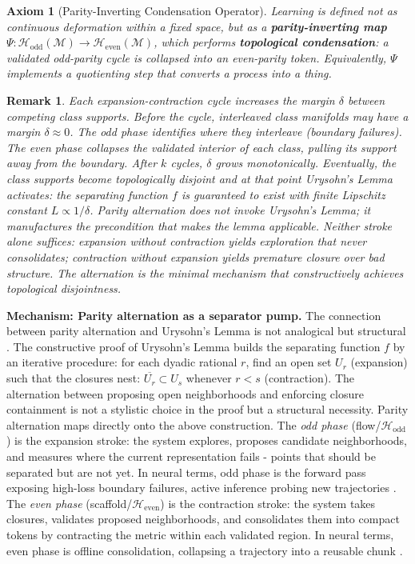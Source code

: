 \documentclass{article}
\newcommand{\Heven}{\mathcal{H}_{\text{even}}}
\newcommand{\Hodd}{\mathcal{H}_{\text{odd}}}
\newtheorem{remark}{Remark}
\newtheorem{axiom}{Axiom}
\begin{document}
\begin{axiom}[Parity-Inverting Condensation Operator]
Learning is defined not as continuous deformation within a fixed space, but as a \textbf{parity-inverting map}
$\Psi:\Hodd(\mathcal{M}) \rightarrow \Heven(\mathcal{M})$,
which performs \textbf{topological condensation}: a validated odd-parity cycle is collapsed into an even-parity token. Equivalently, $\Psi$ implements a quotienting step that converts a \emph{process} into a \emph{thing}.
\end{axiom}

\begin{remark}
Each expansion-contraction cycle increases the margin $\delta$ between competing class supports. Before the cycle, interleaved class manifolds may have a margin $\delta \approx 0$. The odd phase identifies \emph{where} they interleave (boundary failures). The even phase collapses the validated interior of each class, pulling its support away from the boundary. After $k$ cycles, $\delta$ grows monotonically. Eventually, the class supports become topologically disjoint and at that point Urysohn's Lemma activates: the separating function $f$ is guaranteed to exist with finite Lipschitz constant $L \propto 1/\delta$. Parity alternation does not invoke Urysohn's Lemma; it \emph{manufactures the precondition} that makes the lemma applicable. Neither stroke alone suffices: expansion without contraction yields exploration that never consolidates; contraction without expansion yields premature closure over bad structure. The alternation is the minimal mechanism that constructively achieves topological disjointness.
\end{remark} 

\noindent\textbf{Mechanism: Parity alternation as a separator pump.}
The connection between parity alternation and Urysohn's Lemma is not analogical but structural \cite{gentner_structure-mapping_1983}. The constructive proof of Urysohn's Lemma builds the separating function $f$ by an iterative procedure: for each dyadic rational $r$, find an open set $U_r$ (expansion) such that the closures nest: $\overline{U_r} \subset U_s$ whenever $r < s$ (contraction). The alternation between proposing open neighborhoods and enforcing closure containment is not a stylistic choice in the proof but a structural necessity.
Parity alternation maps directly onto the above construction. The \emph{odd phase} (flow/$\Hodd$) is the expansion stroke: the system explores, proposes candidate neighborhoods, and measures where the current representation fails - points that should be separated but are not yet. In neural terms, odd phase is the forward pass exposing high-loss boundary failures, active inference probing new trajectories \cite{friston2017active}. The \emph{even phase} (scaffold/$\Heven$) is the contraction stroke: the system takes closures, validates proposed neighborhoods, and consolidates them into compact tokens by contracting the metric within each validated region. In neural terms, even phase is offline consolidation, collapsing a trajectory into a reusable chunk \cite{squire2015memory}.
\end{document}
